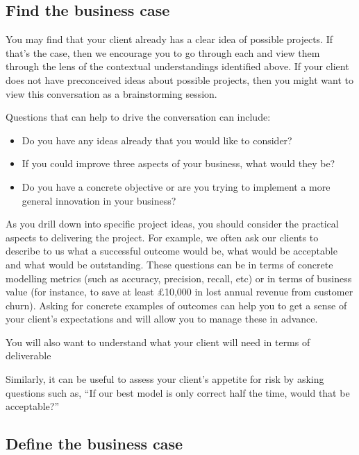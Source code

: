 \documentclass[
]{book}
\providecommand{\tightlist}{%
  \setlength{\itemsep}{0pt}\setlength{\parskip}{0pt}}
\begin{document}
\hypertarget{find-the-business-case}{%
\subsection{Find the business case}\label{find-the-business-case}}

You may find that your client already has a clear idea of possible projects. If that's the case, then we encourage you to go through each and view them through the lens of the contextual understandings identified above. If your client does not have preconceived ideas about possible projects, then you might want to view this conversation as a brainstorming session.

Questions that can help to drive the conversation can include:

\begin{itemize}
\tightlist
\item
  Do you have any ideas already that you would like to consider?
\item
  If you could improve three aspects of your business, what would they be?
\item
  Do you have a concrete objective or are you trying to implement a more general innovation in your business?
\end{itemize}

As you drill down into specific project ideas, you should consider the practical aspects to delivering the project. For example, we often ask our clients to describe to us what a successful outcome would be, what would be acceptable and what would be outstanding. These questions can be in terms of concrete modelling metrics (such as accuracy, precision, recall, etc) or in terms of business value (for instance, to save at least £10,000 in lost annual revenue from customer churn). Asking for concrete examples of outcomes can help you to get a sense of your client's expectations and will allow you to manage these in advance.

You will also want to understand what your client will need in terms of deliverable

Similarly, it can be useful to assess your client's appetite for risk by asking questions such as, ``If our best model is only correct half the time, would that be acceptable?''

\hypertarget{define-the-business-case}{%
\subsection{Define the business case}\label{define-the-business-case}}
\end{document}
